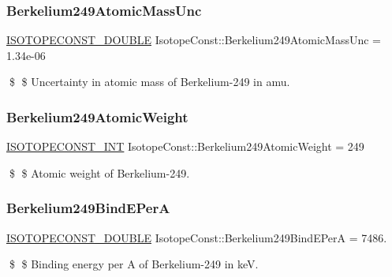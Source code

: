 \subsubsection{\texorpdfstring{Berkelium249\+Atomic\+Mass\+Unc}{Berkelium249AtomicMassUnc}}
{\footnotesize\ttfamily \mbox{\hyperlink{group___isotope_const-_macros_ga8f45a7272ce02c0b4c65c44636ed719a}{I\+S\+O\+T\+O\+P\+E\+C\+O\+N\+S\+T\+\_\+\+D\+O\+U\+B\+LE}} Isotope\+Const\+::\+Berkelium249\+Atomic\+Mass\+Unc = 1.\+34e-\/06}

\$ \$ Uncertainty in atomic mass of Berkelium-\/249 in amu. \mbox{\label{group___isotope_const-_berkelium-_bk249_gadf1d5fa15a4ef37c05c59dcdec452936}} 
\subsubsection{\texorpdfstring{Berkelium249\+Atomic\+Weight}{Berkelium249AtomicWeight}}
{\footnotesize\ttfamily \mbox{\hyperlink{group___isotope_const-_macros_ga5f18360b3e99483a35c32d789e62621c}{I\+S\+O\+T\+O\+P\+E\+C\+O\+N\+S\+T\+\_\+\+I\+NT}} Isotope\+Const\+::\+Berkelium249\+Atomic\+Weight = 249}

\$ \$ Atomic weight of Berkelium-\/249. \mbox{\label{group___isotope_const-_berkelium-_bk249_ga2278015970a9b876a1fb4c2c2949ad4c}} 
\subsubsection{\texorpdfstring{Berkelium249\+Bind\+E\+PerA}{Berkelium249BindEPerA}}
{\footnotesize\ttfamily \mbox{\hyperlink{group___isotope_const-_macros_ga8f45a7272ce02c0b4c65c44636ed719a}{I\+S\+O\+T\+O\+P\+E\+C\+O\+N\+S\+T\+\_\+\+D\+O\+U\+B\+LE}} Isotope\+Const\+::\+Berkelium249\+Bind\+E\+PerA = 7486.}

\$ \$ Binding energy per A of Berkelium-\/249 in keV. \mbox{\label{group___isotope_const-_berkelium-_bk249_ga7a8a345ae506b848b462a49344027b0b}} 
